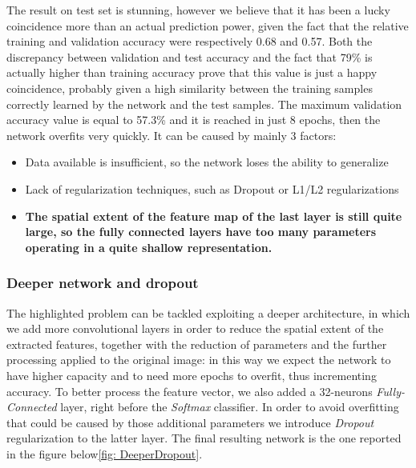 \medskip

\noindent The result on test set is stunning, however we believe that it has been a lucky coincidence more than an actual prediction power, given the fact that the relative training and validation accuracy were respectively 0.68 and 0.57. Both the discrepancy between validation and test accuracy and the fact that 79\% is actually higher than training accuracy prove that this value is just a happy coincidence, probably given a high similarity between the training samples correctly learned by the network and the test samples. The maximum validation accuracy value is equal to 57.3\% and it is reached in just 8 epochs, then the network overfits very quickly. It can be caused by mainly 3 factors:
\begin{itemize}
\item Data available is insufficient, so the network loses the ability to generalize
\item Lack of regularization techniques, such as Dropout or L1/L2 regularizations
\item \textbf{The spatial extent of the feature map of the last layer is still quite large, so the fully connected layers have too many parameters operating in a quite shallow representation.} 
\end{itemize} 

\subsubsection{Deeper network and dropout}
The highlighted problem can be tackled exploiting a deeper architecture, in which we add more convolutional layers in order to reduce the spatial extent of the extracted features, together with the reduction of parameters and the further processing applied to the original image: in this way we expect the network to have higher capacity and to need more epochs to overfit, thus incrementing accuracy.
To better process the feature vector, we also added a 32-neurons \textit{Fully-Connected }layer, right before the \textit{Softmax} classifier. In order to avoid overfitting that could be caused by those additional parameters we introduce \textit{Dropout} regularization to the latter layer.   
The final resulting network is the one reported in the figure below\ref{fig: DeeperDropout}.

